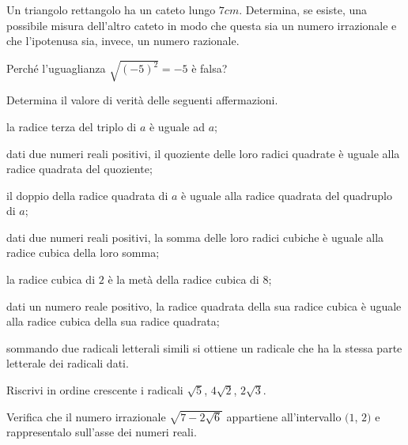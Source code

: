 \begin{esercizio}%
Un triangolo rettangolo ha un cateto lungo $7\unit{cm}$. Determina, se esiste, una possibile misura dell’altro cateto in modo che questa sia un numero irrazionale e che l’ipotenusa sia, invece, un numero razionale.
\end{esercizio}

\begin{esercizio}%
Perché l'uguaglianza $\sqrt{(-5)^2}=-5$ è falsa?
\end{esercizio}

\begin{esercizio}%
Determina il valore di verità delle seguenti affermazioni.
\begin{enumeratea}
 \item la radice terza del triplo di $a$ è uguale ad $a$;
 \item dati due numeri reali positivi, il quoziente delle loro radici quadrate è uguale alla radice quadrata del quoziente;
 \item il doppio della radice quadrata di $a$ è uguale alla radice quadrata del quadruplo di $a$;
 \item dati due numeri reali positivi, la somma delle loro radici cubiche è uguale alla radice cubica della loro somma;
 \item la radice cubica di $2$ è la metà della radice cubica di $8$;
 \item dati un numero reale positivo, la radice quadrata della sua radice cubica è uguale alla radice cubica della sua radice quadrata;
 \item sommando due radicali letterali simili si ottiene un radicale che ha la stessa parte letterale dei radicali dati.
\end{enumeratea}
\end{esercizio}

\begin{esercizio}%
Riscrivi in ordine crescente i radicali $\sqrt 5$, $4\sqrt 2$, $2\sqrt 3$.
\end{esercizio}

\begin{esercizio}%
Verifica che il numero irrazionale $\sqrt{7-2\sqrt 6}$ appartiene all'intervallo $(1$, $2)$ e rappresentalo sull'asse dei numeri reali.
\end{esercizio}

